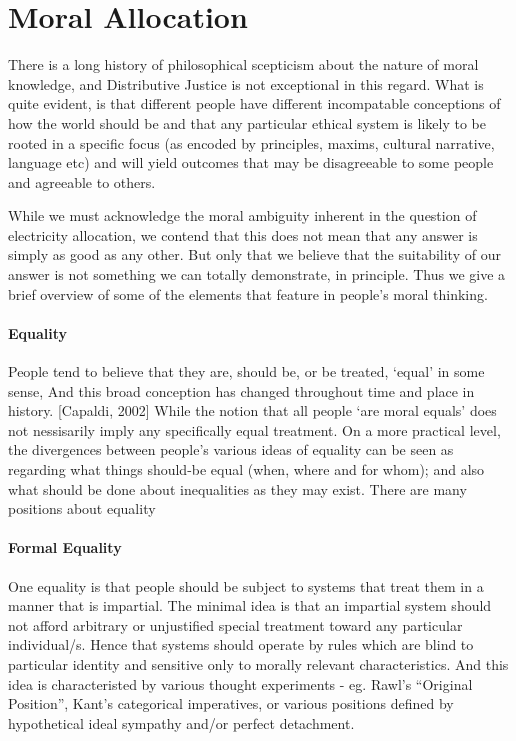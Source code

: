 \documentclass[
10pt, %
a4paper, %
oneside, %
headinclude,footinclude, %
BCOR5mm, %
]{scrartcl}
\begin{document}
\section{Moral Allocation}

There is a long history of philosophical scepticism about the nature of moral knowledge, and Distributive Justice is not exceptional in this regard.
What is quite evident, is that different people have different incompatable conceptions of how the world should be and that any particular ethical system is likely to be rooted in a specific focus (as encoded by principles, maxims, cultural narrative, language etc) and will yield outcomes that may be disagreeable to some people and agreeable to others.

While we must acknowledge the moral ambiguity inherent in the question of electricity allocation, we contend that this does not mean that any answer is simply as good as any other.
But only that we believe that the suitability of our answer is not something we can totally demonstrate, in principle.
Thus we give a brief overview of some of the elements that feature in people's moral thinking.

\paragraph{Equality}

People tend to believe that they are, should be, or be treated, ‘equal’ in some sense, And this broad conception has changed throughout time and place in history. [Capaldi, 2002]
While the notion that all people `are moral equals' does not nessisarily imply any specifically equal treatment. On a more practical level, the divergences between people's various ideas of equality can be seen as regarding what things should-be equal (when, where and for whom); and also what should be done about inequalities as they may exist.
There are many positions about equality

\paragraph{Formal Equality}

One equality is that people should be subject to systems that treat them in a manner that is impartial. The minimal idea is that an impartial system should not afford arbitrary or unjustified special treatment toward any particular individual/s. Hence that systems should operate by rules which are blind to particular identity and sensitive only to morally relevant characteristics.
And this idea is characteristed by various thought experiments - eg. Rawl’s “Original Position”, Kant’s categorical imperatives, or various positions defined by hypothetical ideal sympathy and/or perfect detachment.
\end{document}
